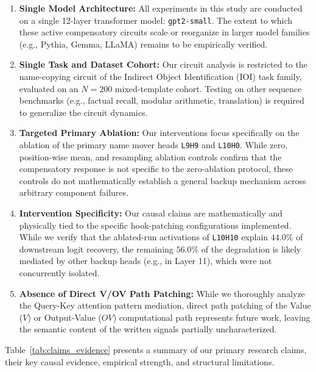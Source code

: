 \documentclass[12pt,a4paper]{article}
\begin{document}
\begin{enumerate}
  \item \textbf{Single Model Architecture:} All experiments in this study are conducted on a single 12-layer transformer model: \texttt{gpt2-small}. The extent to which these active compensatory circuits scale or reorganize in larger model families (e.g., Pythia, Gemma, LLaMA) remains to be empirically verified.
  \item \textbf{Single Task and Dataset Cohort:} Our circuit analysis is restricted to the name-copying circuit of the Indirect Object Identification (IOI) task family, evaluated on an $N=200$ mixed-template cohort. Testing on other sequence benchmarks (e.g., factual recall, modular arithmetic, translation) is required to generalize the circuit dynamics.
  \item \textbf{Targeted Primary Ablation:} Our interventions focus specifically on the ablation of the primary name mover heads \texttt{L9H9} and \texttt{L10H0}. While zero, position-wise mean, and resampling ablation controls confirm that the compensatory response is not specific to the zero-ablation protocol, these controls do not mathematically establish a general backup mechanism across arbitrary component failures.
  \item \textbf{Intervention Specificity:} Our causal claims are mathematically and physically tied to the specific hook-patching configurations implemented. While we verify that the ablated-run activations of \texttt{L10H10} explain $44.0\%$ of downstream logit recovery, the remaining $56.0\%$ of the degradation is likely mediated by other backup heads (e.g., in Layer 11), which were not concurrently isolated.
  \item \textbf{Absence of Direct V/OV Path Patching:} While we thoroughly analyze the Query-Key attention pattern mediation, direct path patching of the Value ($V$) or Output-Value ($OV$) computational path represents future work, leaving the semantic content of the written signals partially uncharacterized.
\end{enumerate}

Table~\ref{tab:claims_evidence} presents a summary of our primary research claims, their key causal evidence, empirical strength, and structural limitations.
\end{document}
